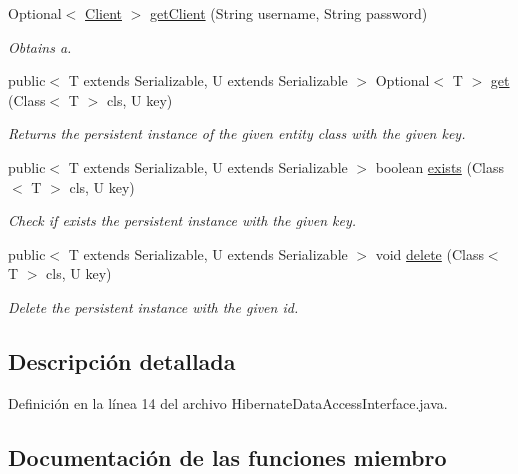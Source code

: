 \begin{DoxyCompactItemize}
Optional$<$ \mbox{\hyperlink{classcom_1_1ruralhousejsf_1_1domain_1_1_client}{Client}} $>$ \mbox{\hyperlink{interfacecom_1_1ruralhousejsf_1_1data_access_1_1_hibernate_data_access_interface_abf581529aefd317dffd1d2ca0906c3ac}{get\+Client}} (String username, String password)
\begin{DoxyCompactList}\small\item\em Obtains a. \end{DoxyCompactList}\item 
public$<$ T extends Serializable, U extends Serializable $>$ Optional$<$ T $>$ \mbox{\hyperlink{interfacecom_1_1ruralhousejsf_1_1data_access_1_1_hibernate_data_access_interface_a59446f9ebfa6acfa2315debdca84d360}{get}} (Class$<$ T $>$ cls, U key)
\begin{DoxyCompactList}\small\item\em Returns the persistent instance of the given entity class with the given key. \end{DoxyCompactList}\item 
public$<$ T extends Serializable, U extends Serializable $>$ boolean \mbox{\hyperlink{interfacecom_1_1ruralhousejsf_1_1data_access_1_1_hibernate_data_access_interface_ac4fef50cac8142bfd12685d7fe48d926}{exists}} (Class$<$ T $>$ cls, U key)
\begin{DoxyCompactList}\small\item\em Check if exists the persistent instance with the given key. \end{DoxyCompactList}\item 
public$<$ T extends Serializable, U extends Serializable $>$ void \mbox{\hyperlink{interfacecom_1_1ruralhousejsf_1_1data_access_1_1_hibernate_data_access_interface_a887957b637255d48878d157ee414027a}{delete}} (Class$<$ T $>$ cls, U key)
\begin{DoxyCompactList}\small\item\em Delete the persistent instance with the given id. \end{DoxyCompactList}\end{DoxyCompactItemize}


\subsection{Descripción detallada}


Definición en la línea 14 del archivo Hibernate\+Data\+Access\+Interface.\+java.



\subsection{Documentación de las funciones miembro}
\mbox{\label{interfacecom_1_1ruralhousejsf_1_1data_access_1_1_hibernate_data_access_interface_a4671ad8ff75ef8a9195974dbdcd95e7f}} 
